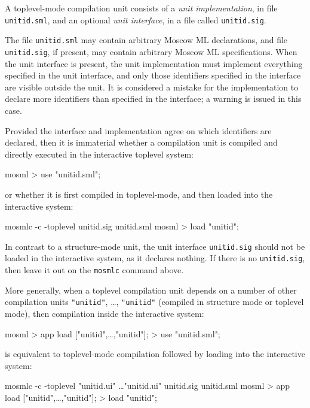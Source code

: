 \documentclass[fleqn,a4paper]{article}
\begin{document}
A toplevel-mode compilation unit consists of a {\em unit
  implementation}, in file \texttt{unitid.sml}, and an optional {\em
  unit interface}, in a file called \texttt{unitid.sig}\@.  

The file \texttt{unitid.sml} may contain arbitrary Moscow ML
declarations, and file \texttt{unitid.sig}, if present, may contain
arbitrary Moscow ML specifications.  When the unit interface is
present, the unit implementation must implement everything specified
in the unit interface, and only those identifiers specified in the
interface are visible outside the unit.  It is considered a
mistake for the implementation to declare more identifiers than
specified in the interface; a warning is issued in this case.

Provided the interface and implementation agree on which identifiers
are declared, then it is immaterial whether a compilation unit is
compiled and directly executed in the interactive toplevel system:

\begin{program}
mosml
> use "unitid.sml";
\end{program}

\noindent 
or whether it is first compiled in toplevel-mode, and then loaded into
the interactive system:

\begin{program}
mosmlc -c -toplevel unitid.sig unitid.sml 
mosml
> load "unitid";
\end{program}

\noindent In contrast to a structure-mode unit, the
unit interface \texttt{unitid.sig} should not be loaded in the
interactive system, as it declares nothing.  If there is no
\texttt{unitid.sig}, then leave it out on the \texttt{mosmlc} command
above.

More generally, when a toplevel compilation unit depends on a number
of other compilation units \texttt{"unitid\et"}, \ldots,
\texttt{"unitid\n"} (compiled in structure mode or toplevel mode),
then compilation inside the interactive system:

\begin{program}
mosml
> app load ["unitid\et",\ldots,"unitid\n"];
> use "unitid.sml";
\end{program}

\noindent is equivalent to toplevel-mode compilation followed by
loading into the interactive system:

\begin{program}
mosmlc -c -toplevel "unitid\et.ui" \ldots "unitid\n.ui" unitid.sig unitid.sml 
mosml
> app load ["unitid\et",\ldots,"unitid\n"];
> load "unitid";
\end{program}
\end{document}
